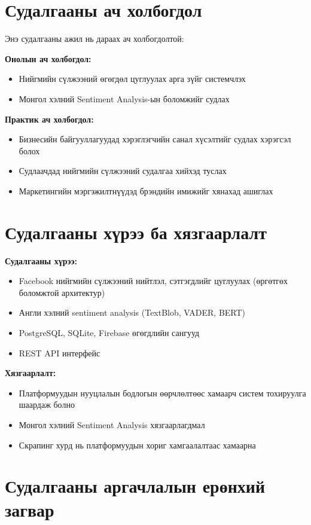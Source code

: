 \documentclass[12pt,a4paper]{report}
\begin{document}
\section{Судалгааны ач холбогдол}

Энэ судалгааны ажил нь дараах ач холбогдолтой:

\textbf{Онолын ач холбогдол:}
\begin{itemize}
    \item Нийгмийн сүлжээний өгөгдөл цуглуулах арга зүйг системчлэх
    \item Монгол хэлний Sentiment Analysis-ын боломжийг судлах
\end{itemize}

\textbf{Практик ач холбогдол:}
\begin{itemize}
    \item Бизнесийн байгууллагуудад хэрэглэгчийн санал хүсэлтийг судлах хэрэгсэл болох
    \item Судлаачдад нийгмийн сүлжээний судалгаа хийхэд туслах
    \item Маркетингийн мэргэжилтнүүдэд брэндийн имижийг хянахад ашиглах
\end{itemize}

\section{Судалгааны хүрээ ба хязгаарлалт}

\textbf{Судалгааны хүрээ:}
\begin{itemize}
    \item Facebook нийгмийн сүлжээний нийтлэл, сэтгэгдлийг цуглуулах (өргөтгөх боломжтой архитектур)
    \item Англи хэлний sentiment analysis (TextBlob, VADER, BERT)
    \item PostgreSQL, SQLite, Firebase өгөгдлийн сангууд
    \item REST API интерфейс
\end{itemize}

\textbf{Хязгаарлалт:}
\begin{itemize}
    \item Платформуудын нууцлалын бодлогын өөрчлөлтөөс хамаарч систем тохируулга шаардаж болно
    \item Монгол хэлний Sentiment Analysis хязгаарлагдмал
    \item Скрапинг хурд нь платформуудын хориг хамгаалалтаас хамаарна
\end{itemize}

\section{Судалгааны аргачлалын ерөнхий загвар}
\end{document}
